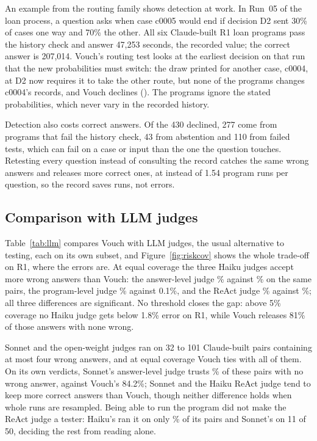 An example from the routing family shows detection at work. In Run~05 of the loan process, a question asks when case c0005 would end if decision D2 sent 30\% of cases one way and 70\% the other. All six Claude-built \otf R1 loan programs pass the history check and answer 47{,}253 seconds, the recorded value; the correct answer is 207{,}014. Vouch's routing test looks at the earliest decision on that run that the new probabilities must switch: the draw printed for another case, c0004, at D2 now requires it to take the other route, but none of the programs changes c0004's records, and Vouch declines (\Caught). The programs ignore the stated probabilities, which never vary in the recorded history.

Detection also costs correct answers. Of the 430 declined, 277 come from programs that fail the history check, 43 from abstention and 110 from failed tests, which can fail on a case or input than the one the question touches. Retesting every question instead of consulting the record catches the same wrong answers and releases \rFreshRightRecovered{} more correct ones, at \rFreshExecPerQ{} instead of 1.54 program runs per question, so the record saves runs, not errors.

\subsection{Comparison with LLM judges}
\label{sec:results:llm}

Table~\ref{tab:llm} compares Vouch with LLM judges, the usual alternative to testing, each on its own subset, and Figure~\ref{fig:riskcov} shows the whole trade-off on \otf R1, where the errors are. At equal coverage the three Haiku judges accept more wrong answers than Vouch: the answer-level judge \rAnsJudgeErrClaude\% against \rGateErrAnsSub\% on the same \rAnsJudgeN{} pairs, the program-level judge \rProgJudgeErrClaude\% against 0.1\%, and the ReAct judge \rReactErrClaude\% against \rGateErrReactSub\%; all three differences are significant. No threshold closes the gap: above 5\% coverage no Haiku judge gets below 1.8\% error on \otf R1, while Vouch releases 81\% of those answers with none wrong.

Sonnet and the open-weight judges ran on 32 to 101 Claude-built pairs containing at most four wrong answers, and at equal coverage Vouch ties with all of them. On its own verdicts, Sonnet's answer-level judge trusts \rSonnetAnsOwnCov\% of these pairs with no wrong answer, against Vouch's 84.2\%; Sonnet and the Haiku ReAct judge tend to keep more correct answers than Vouch, though neither difference holds when whole runs are resampled. Being able to run the program did not make the ReAct judge a tester: Haiku's ran it on only \rReactRanProgHaiku\% of its pairs and Sonnet's on 11 of 50, deciding the rest from reading alone.

